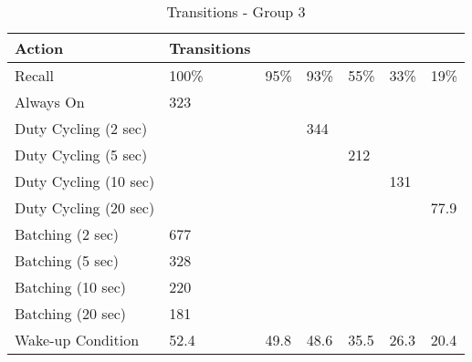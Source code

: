 \begin{table*}[t]
    \begin{tabular}{|l|l|l|l|l|l|l|}
    \hline
    Action                & Transitions & ~    & ~    & ~    & ~    & ~    \\ \hline
    Recall                & 100\%       & 95\% & 93\% & 55\% & 33\% & 19\% \\ \hline
    Always On             & 323         & ~    & ~    & ~    & ~    & ~    \\ \hline
    Duty Cycling (2 sec)  & ~           & ~    & 344  & ~    & ~    & ~    \\ \hline
    Duty Cycling (5 sec)  & ~           & ~    & ~    & 212  & ~    & ~    \\ \hline
    Duty Cycling (10 sec) & ~           & ~    & ~    & ~    & 131  & ~    \\ \hline
    Duty Cycling (20 sec) & ~           & ~    & ~    & ~    & ~    & 77.9 \\ \hline
    Batching (2 sec)      & 677         & ~    & ~    & ~    & ~    & ~    \\ \hline
    Batching (5 sec)      & 328         & ~    & ~    & ~    & ~    & ~    \\ \hline
    Batching (10 sec)     & 220         & ~    & ~    & ~    & ~    & ~    \\ \hline
    Batching (20 sec)     & 181         & ~    & ~    & ~    & ~    & ~    \\ \hline
    Wake-up Condition     & 52.4        & 49.8 & 48.6 & 35.5 & 26.3 & 20.4 \\ \hline
    \end{tabular}
	\caption{Transitions - Group 3}
	\label{table:powerProfileNexus}
\end{table*}

